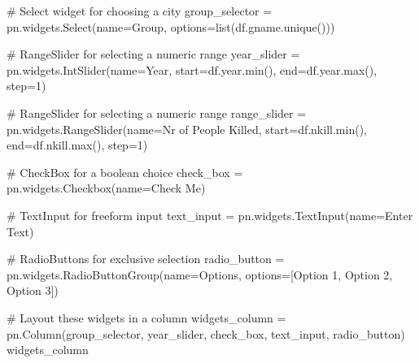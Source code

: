 \documentclass[
  letterpaper,
  DIV=11,
  numbers=noendperiod]{scrreprt}
\newenvironment{Shaded}{\begin{snugshade}}{\end{snugshade}}
\newcommand{\BuiltInTok}[1]{\textcolor[rgb]{0.00,0.23,0.31}{#1}}
\newcommand{\CommentTok}[1]{\textcolor[rgb]{0.37,0.37,0.37}{#1}}
\newcommand{\DecValTok}[1]{\textcolor[rgb]{0.68,0.00,0.00}{#1}}
\newcommand{\NormalTok}[1]{\textcolor[rgb]{0.00,0.23,0.31}{#1}}
\newcommand{\OperatorTok}[1]{\textcolor[rgb]{0.37,0.37,0.37}{#1}}
\newcommand{\StringTok}[1]{\textcolor[rgb]{0.13,0.47,0.30}{#1}}
\begin{document}
\begin{Shaded}
\begin{Highlighting}[]
\CommentTok{\# Select widget for choosing a city}
\NormalTok{group\_selector }\OperatorTok{=}\NormalTok{ pn.widgets.Select(name}\OperatorTok{=}\StringTok{\textquotesingle{}Group\textquotesingle{}}\NormalTok{, options}\OperatorTok{=}\BuiltInTok{list}\NormalTok{(df.gname.unique()))}

\CommentTok{\# RangeSlider for selecting a numeric range}
\NormalTok{year\_slider }\OperatorTok{=}\NormalTok{ pn.widgets.IntSlider(name}\OperatorTok{=}\StringTok{\textquotesingle{}Year\textquotesingle{}}\NormalTok{, start}\OperatorTok{=}\NormalTok{df.year.}\BuiltInTok{min}\NormalTok{(), end}\OperatorTok{=}\NormalTok{df.year.}\BuiltInTok{max}\NormalTok{(), step}\OperatorTok{=}\DecValTok{1}\NormalTok{)}

\CommentTok{\# RangeSlider for selecting a numeric range}
\NormalTok{range\_slider }\OperatorTok{=}\NormalTok{ pn.widgets.RangeSlider(name}\OperatorTok{=}\StringTok{\textquotesingle{}Nr of People Killed\textquotesingle{}}\NormalTok{, start}\OperatorTok{=}\NormalTok{df.nkill.}\BuiltInTok{min}\NormalTok{(), end}\OperatorTok{=}\NormalTok{df.nkill.}\BuiltInTok{max}\NormalTok{(), step}\OperatorTok{=}\DecValTok{1}\NormalTok{)}

\CommentTok{\# CheckBox for a boolean choice}
\NormalTok{check\_box }\OperatorTok{=}\NormalTok{ pn.widgets.Checkbox(name}\OperatorTok{=}\StringTok{\textquotesingle{}Check Me\textquotesingle{}}\NormalTok{)}

\CommentTok{\# TextInput for freeform input}
\NormalTok{text\_input }\OperatorTok{=}\NormalTok{ pn.widgets.TextInput(name}\OperatorTok{=}\StringTok{\textquotesingle{}Enter Text\textquotesingle{}}\NormalTok{)}

\CommentTok{\# RadioButtons for exclusive selection}
\NormalTok{radio\_button }\OperatorTok{=}\NormalTok{ pn.widgets.RadioButtonGroup(name}\OperatorTok{=}\StringTok{\textquotesingle{}Options\textquotesingle{}}\NormalTok{, options}\OperatorTok{=}\NormalTok{[}\StringTok{\textquotesingle{}Option 1\textquotesingle{}}\NormalTok{, }\StringTok{\textquotesingle{}Option 2\textquotesingle{}}\NormalTok{, }\StringTok{\textquotesingle{}Option 3\textquotesingle{}}\NormalTok{])}
\end{Highlighting}
\end{Shaded}

\begin{Shaded}
\begin{Highlighting}[]
\CommentTok{\# Layout these widgets in a column}
\NormalTok{widgets\_column }\OperatorTok{=}\NormalTok{ pn.Column(group\_selector, year\_slider, check\_box, text\_input, radio\_button)}
\NormalTok{widgets\_column}
\end{Highlighting}
\end{Shaded}
\end{document}
